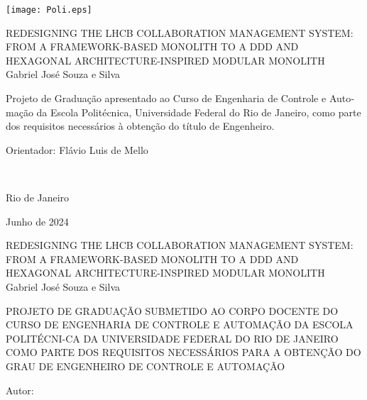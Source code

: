 \texttt{[image: Poli.eps]}

\begin{center}
\large{REDESIGNING THE LHCB COLLABORATION MANAGEMENT SYSTEM: FROM A FRAMEWORK-BASED MONOLITH TO A DDD AND HEXAGONAL ARCHITECTURE-INSPIRED MODULAR MONOLITH}\\
   \vspace{2cm}
\large{Gabriel José Souza e Silva}\\
\end{center}
   \vspace{3cm}
\hspace{6cm}
\hfill \parbox{8.0cm}{
\begin{otherlanguage}{portuguese}
Projeto de Graduação apresentado ao Curso de Engenharia de Controle e Automação da Escola Politécnica, Universidade Federal do Rio de Janeiro, como parte dos requisitos necessários à obtenção do título de Engenheiro.\\
\end{otherlanguage}}
   \vspace{2cm}
\hfill \parbox{8.0cm}{Orientador: Flávio Luis de Mello} \\
   \vspace{1cm}
\begin{center}
Rio de Janeiro

Junho de 2024
\end{center}




\pagebreak


\begin{center}
\large{REDESIGNING THE LHCB COLLABORATION MANAGEMENT SYSTEM: FROM A FRAMEWORK-BASED MONOLITH TO A DDD AND HEXAGONAL ARCHITECTURE-INSPIRED MODULAR MONOLITH}\\
   \vspace{1cm}
\large{Gabriel José Souza e Silva}\\
\end{center}
   \vspace{2cm}
\begin{otherlanguage}{portuguese}
PROJETO DE GRADUAÇÃO SUBMETIDO AO CORPO DOCENTE DO CURSO DE ENGENHARIA DE CONTROLE E AUTOMAÇÃO DA ESCOLA POLITÉCNI-CA DA UNIVERSIDADE FEDERAL DO RIO DE JANEIRO COMO PARTE DOS REQUISITOS NECESSÁRIOS PARA A OBTENÇÃO DO GRAU DE ENGENHEIRO DE CONTROLE E AUTOMAÇÃO\end{otherlanguage}
   
   \vspace{1cm}
Autor:
      \vspace{0.5cm}
      \begin{flushright}
         \parbox{10cm}{
            \hrulefill

            \vspace{-.375cm}

            \vspace{0.1cm}
         }
      \end{flushright}
      
